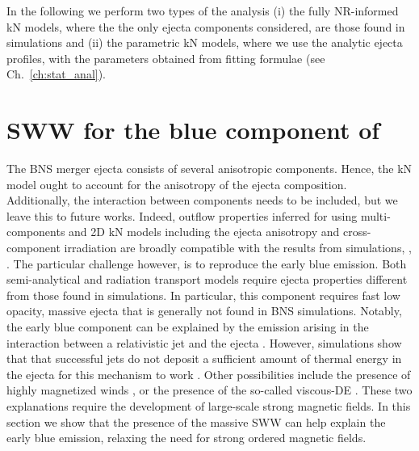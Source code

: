 
In the following we perform two types of the analysis (i) the fully \ac{NR}-informed \ac{kN} models, where the the only ejecta components considered, are those found in simulations and (ii) the parametric \ac{kN} models, where we use the analytic ejecta profiles, with the parameters obtained from fitting formulae (see Ch.~\ref{ch:stat_anal}).


\section{\ac{SWW} for the blue component of \AT{}}\label{sec:kilonova:result}

The \ac{BNS} merger ejecta consists of several anisotropic components.
Hence, the \ac{kN} model ought to account for the anisotropy of the ejecta composition. Additionally, the interaction between components needs to be included, but we leave this to future works.
Indeed, outflow properties inferred for \AT{} using multi-components and 2D \ac{kN} models including the ejecta anisotropy and cross-component irradiation are broadly compatible with the results from simulations, \eg, \citep{Perego:2017wtu,Kawaguchi:2018ptg}.
The particular challenge however, is to reproduce the early blue emission. 
Both semi-analytical and radiation transport
models require ejecta properties different from those found in
simulations. In particular, 
this component requires fast low opacity, massive ejecta \citep{Fahlman:2018llv} that is generally 
not found in \ac{BNS} simulations.
Notably, the early blue component can be explained by the emission arising 
in the interaction between a relativistic jet and the ejecta
\citep{Lazzati:2016yxl,Bromberg:2017crh,Piro:2017ayh}.
However, simulations show that that successful jets do not deposit a sufficient amount of thermal energy in the ejecta for this mechanism to work \citep{Duffell:2018iig}. 
Other possibilities include the presence of highly magnetized winds \citep{Metzger:2018uni,Fernandez:2018kax},
or the presence of the so-called viscous-\ac{DE} \citep{Radice:2018ghv}.
These two explanations require the development of large-scale strong magnetic fields.
In this section we show that the presence of the massive \ac{SWW} can help explain the early blue emission, relaxing the need for strong ordered magnetic fields. 

